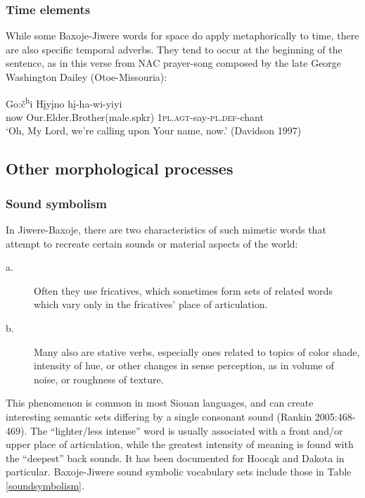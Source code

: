 \documentclass[output=paper]{LSP/langsci}
\begin{document}
\subsubsection{Time elements}  While some Baxoje-Jiwere words for space do apply metaphorically to time, there are also specific temporal adverbs.  They tend to occur at the beginning of the sentence, as in this verse from NAC prayer-song composed by the late George Washington Dailey (Otoe-Missouria):

\ea \gll Go:\v{c}\textsuperscript{h}i   H\k{i}y\k{i}no    h\k{i}-ha-wi-yiyi \\
now     Our.Elder.Brother(male.spkr) \textsc{1pl.agt}-say-\textsc{pl.def}-chant	\\
\glt `Oh, My Lord, we're calling upon Your name, now.'	(Davidson 1997)
\z

\subsection{Other morphological processes}

\subsubsection{Sound symbolism}  

In Jiwere-Baxoje, there are two characteristics of such mimetic words that attempt to recreate certain sounds or material aspects of the world:   

\begin{description}
\item[a.] Often they use fricatives,  which sometimes form sets of related words which vary only in the fricatives' place of articulation.   
\item[b.] Many also are stative verbs, especially ones related to topics of color shade, intensity of hue, or other changes in sense perception, as in volume of noise, or roughness of texture. 
\end{description}

 This phenomenon is common in most Siouan languages, and can create interesting semantic sets differing by a single consonant sound (Rankin 2005:468-469). The ``lighter/less intense'' word is usually associated with a front and/or upper place of articulation, while the greatest intensity of meaning is found with the ``deepest'' back sounds.  It has been documented for Hooc\k{a}k and Dakota in particular.  Baxoje-Jiwere sound symbolic vocabulary sets include those in Table \ref{soundsymbolism}. 
 
\end{document}
